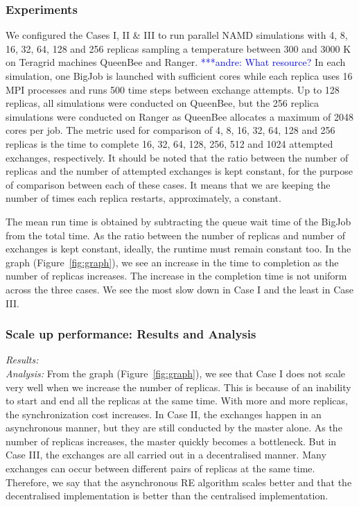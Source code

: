 \documentclass{rspublic}
\newcommand{\alnote}[1]{ {\textcolor{blue} { ***andre: #1 }}}
\newcommand{\alnote}[1]{}
\begin{document}
\subsubsection{Experiments}
We configured the Cases I, II \& III to run parallel NAMD simulations with 4, 8, 16, 32, 64, 128 and 256 replicas sampling a temperature between 300 and 3000 K on Teragrid machines QueenBee and Ranger. \alnote{What resource?} In each simulation, one BigJob is launched with sufficient cores while each replica uses 16 MPI processes and runs 500 time steps between exchange attempts. Up to 128 replicas, all simulations were conducted on QueenBee, but the 256 replica simulations were conducted on Ranger as QueenBee allocates a maximum of 2048 cores per job. The metric used for comparison of 4, 8, 16, 32, 64, 128 and 256 replicas is the time to complete 16, 32, 64, 128, 256, 512 and 1024 attempted exchanges, respectively. It should be noted that the ratio between the number of replicas and the number of attempted exchanges is kept constant, for the purpose of comparison between each of these cases. It means that we are keeping the number of times each replica restarts, approximately, a constant. 

The mean run time is obtained by subtracting the queue wait time of the BigJob from the total time. As the ratio between the number of replicas and number of exchanges is kept constant, ideally, the runtime must remain constant too. In the graph (Figure~\ref{fig:graph}), we see an increase in the time to completion as the number of replicas increases. The increase in the completion time is not uniform across the three cases. We see the most slow down in Case I and the least in Case III.

\subsubsection{Scale up performance: Results and Analysis}

{\it Results:}\\

{\it Analysis: } From the graph (Figure~\ref{fig:graph}), we see that
Case I does not scale very well when we increase the number of
replicas. This is because of an inability to start and end all the
replicas at the same time. With more and more replicas, the
synchronization cost increases.  In Case II, the exchanges happen in
an asynchronous manner, but they are still conducted by the master
alone. As the number of replicas increases, the master quickly becomes
a bottleneck. But in Case III, the exchanges are all carried out in a
decentralised manner. Many exchanges can occur between different pairs
of replicas at the same time. Therefore, we say that the asynchronous
RE algorithm scales better and that the decentralised implementation
is better than the centralised implementation.
\end{document}
